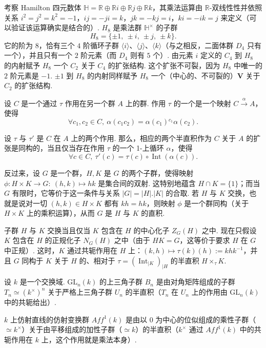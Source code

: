\begin{numpara}[例：四元数群]\label{np:fg-2-2-8}
考察 Hamilton 四元数体 $\mathbb{H}=\mathbb{R}\oplus\mathbb{R}i\oplus\mathbb{R}j\oplus\mathbb{R}k$，其乘法运算由 $\mathbb{R}$-双线性性并依照关系 $i^2=j^2=k^2=-1$，$ij=-ji=k$，$jk=-kj=i$，$ki=-ik=j$ 来定义（可以验证该运算确实是结合的）.  $H_8$ 是乘法群 $\mathbb{H}^\times$ 的子群
\[
H_8=\{\pm1,\ \pm i,\ \pm j,\ \pm k\}.
\]
它的阶为 $8$，恰有三个 $4$ 阶循环子群 $\langle i\rangle$、$\langle j\rangle$、$\langle k\rangle$（与之相反，二面体群 $D_4$ 只有一个），并且只有一个 $2$ 阶元素（而 $D_4$ 则有 $5$ 个）. 由元素 $i$ 定义的 $C_4$ 到 $H_8$ 的内射赋予 $H_8$ 一个 $C_2$ 关于 $C_4$ 的扩张结构. 这个扩张不可裂，因为 $H_8$ 中唯一的 $2$ 阶元素是 $-1$. $\pm1$ 到 $H_8$ 的内射同样赋予 $H_8$ 一个（中心的、不可裂的）$\mathbf{V}$ 关于 $C_2$ 的扩张结构.
\end{numpara}
\begin{numpara}[1-上循环]\label{np:fg-2-2-9}
设 $C$ 是一个通过 $\tau$ 作用在另一个群 $A$ 上的群. 作用 $\tau$ 的一个是一个映射 $C\xrightarrow{\ \alpha\ }A$，使得
\[
\forall c_1,c_2\in C,\ \alpha(c_1c_2)=\alpha(c_1){}^{c_1}\alpha(c_2).
\]
\end{numpara}
\begin{proposition}\label{prop:fg-2-2-10}
设 $\tau$ 与 $\tau'$ 是 $C$ 在 $A$ 上的两个作用. 那么，相应的两个半直积作为 $C$ 关于 $A$ 的扩张是同构的，当且仅当存在作用 $\tau$ 的一个 1-上循环 $\alpha$，使得
\[
\forall c\in C,\ \tau'(c)=\tau(c)\circ\operatorname{Int}(\alpha(c)).
\]
\end{proposition}
\begin{numpara}[识别半直积]\label{np:fg-2-2-11}
反过来，设 $G$ 是一个群，$H,K$ 是 $G$ 的两个子群，使得映射 $\phi:H\times K\longrightarrow G:\ (h,k)\mapsto hk$ 是集合间的双射. 这特别地蕴含 $H\cap K=\{1\}$；而当 $G$ 有限时，它等价于这一条件与关系 $|G|=|H|.|K|$ 的合取. 若 $H$ 与 $K$ 交换，也就是说对一切 $(h,k)\in H\times K$ 都有 $kh=hk$，则映射 $\phi$ 是一个群同构（关于 $H\times K$ 上的乘积运算），从而 $G$ 是 $H$ 与 $K$ 的直积.

子群 $H$ 与 $K$ 交换当且仅当 $K$ 包含在 $H$ 的中心化子 $Z_G(H)$ 之中. 现在只假设 $K$ 包含在 $H$ 的正规化子 $N_G(H)$ 之中（由于 $HK=G$，这等价于要求 $H$ 在 $G$ 中正规）. 这时，$K$ 通过共轭作用在 $H$ 上：$(k,h)\mapsto\tau(k)(h):=khk^{-1}$，并且 $G$ 同构于 $K$ 关于 $H$ 的、相对于 $\tau=(\operatorname{Int}_{|K})_{|H}$ 的半直积 $H\times_\tau K$.
\end{numpara}
\begin{numpara}[例]\label{np:fg-2-2-12}
设 $k$ 是一个交换域. $\mathrm{GL}_n(k)$ 的上三角子群 $B_n$ 是由对角矩阵组成的子群 $T_n\simeq(k^\times)^n$ 关于严格上三角子群 $U_n$ 的半直积（$T_n$ 在 $U_n$ 上的作用由 $\mathrm{GL}_n(k)$ 中的共轭给出）.

$k$ 上仿射直线的仿射变换群 $\mathit{Aff}^1(k)$ 是由以 $0$ 为中心的位似组成的乘性子群（$\simeq k^\times$）关于由平移组成的加性子群（$\simeq k$）的半直积（$k^\times$ 通过 $\mathit{Aff}^1(k)$ 中的共轭作用在 $k$ 上，这个作用就是乘法本身）.
\end{numpara}
